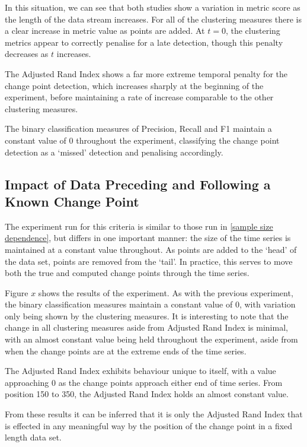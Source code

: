 \documentclass{uvamscse}	%
\begin{document}
In this situation, we can see that both studies show a variation in metric score as the length of the data stream increases. For all of the clustering measures there is a clear increase in metric value as points are added. At $t=0$, the clustering metrics appear to correctly penalise for a late detection, though this penalty decreases as $t$ increases.

The Adjusted Rand Index shows a far more extreme temporal penalty for the change point detection, which increases sharply at the beginning of the experiment, before maintaining a rate of increase comparable to the other clustering measures.

The binary classification measures of Precision, Recall and F1 maintain a constant value of $0$ throughout the experiment, classifying the change point detection as a `missed' detection and penalising accordingly.

\subsection{Impact of Data Preceding and Following a Known Change Point}

The experiment run for this criteria is similar to those run in \autoref{sample size dependence}, but differs in one important manner: the size of the time series is maintained at a constant value throughout. As points are added to the `head' of the data set, points are removed from the `tail'. In practice, this serves to move both the true and computed change points through the time series.


Figure $x$ shows the results of the experiment. As with the previous experiment, the binary classification measures maintain a constant value of $0$, with variation only being shown by the clustering measures. It is interesting to note that the change in all clustering measures aside from Adjusted Rand Index is minimal, with an almost constant value being held throughout the experiment, aside from when the change points are at the extreme ends of the time series.

The Adjusted Rand Index exhibits behaviour unique to itself, with a value approaching 0 as the change points approach either end of time series. From position 150 to 350, the Adjusted Rand Index holds an almost constant value.

From these results it can be inferred that it is only the Adjusted Rand Index that is effected in any meaningful way by the position of the change point in a fixed length data set.
\end{document}
